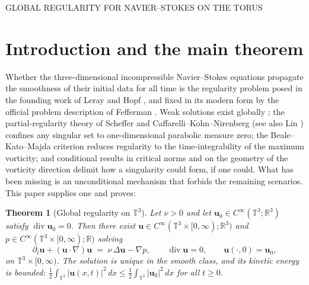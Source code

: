 \documentclass[11pt,letterpaper]{amsart}
\newtheorem{theorem}{Theorem}[section]
\theoremstyle{definition}
\theoremstyle{remark}
\newcommand{\TT}{\mathbb{T}}
\newcommand{\RR}{\mathbb{R}}
\newcommand{\uu}{\boldsymbol{u}}
\newcommand{\dive}{\operatorname{div}}
\newcommand{\abs}[1]{\lvert #1 \rvert}
\begin{document}
%
{\MakeUppercase{Global regularity for Navier--Stokes on the torus}}

\vspace{-1.5pc}

\section{Introduction and the main theorem}\label{sec:intro}

Whether the three-dimensional incompressible Navier--Stokes equations propagate the
smoothness of their initial data for all time is the regularity problem posed in the
founding work of Leray \cite{Leray1934} and Hopf \cite{Hopf1951}, and fixed in its
modern form by the official problem description of Fefferman \cite{Fefferman2006}. Weak
solutions exist globally \cite{Leray1934,Hopf1951}; the partial-regularity theory of
Scheffer \cite{Scheffer1976} and Caffarelli--Kohn--Nirenberg \cite{CKN1982} (see also
Lin \cite{Lin1998}) confines any singular set to one-dimensional parabolic measure
zero; the Beale--Kato--Majda criterion \cite{BealeKatoMajda1984} reduces regularity to
the time-integrability of the maximum vorticity; and conditional results in critical
norms \cite{ESS2003} and on the geometry of the vorticity direction
\cite{ConstantinFefferman1993} delimit how a singularity could form, if one could. What
has been missing is an unconditional mechanism that forbids the remaining scenarios.
This paper supplies one and proves:

\begin{theorem}[Global regularity on $\TT^3$]\label{thm:main}
Let $\nu>0$ and let $\uu_0\in C^\infty(\TT^3;\RR^3)$ satisfy $\dive\uu_0=0$. Then there
exist $\uu\in C^\infty(\TT^3\times[0,\infty);\RR^3)$ and $p\in
C^\infty(\TT^3\times[0,\infty);\RR)$ solving
\begin{equation}\label{eq:nse}
\partial_t \uu + (\uu\cdot\nabla)\uu \;=\; \nu\,\Delta\uu - \nabla p,
\qquad \dive\uu = 0, \qquad \uu(\cdot,0)=\uu_0,
\end{equation}
on $\TT^3\times[0,\infty)$. The solution is unique in the smooth class, and its kinetic
energy is bounded: $\tfrac12\int_{\TT^3}\abs{\uu(x,t)}^2\,dx \le
\tfrac12\int_{\TT^3}\abs{\uu_0}^2\,dx$ for all $t\ge 0$.
\end{theorem}
\end{document}
